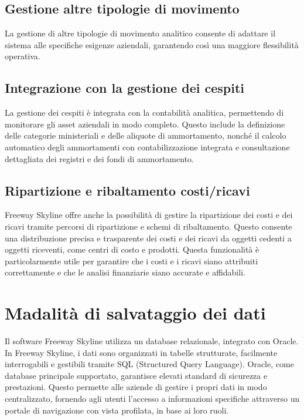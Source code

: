 \documentclass{article}
\begin{document}
\subsection{Gestione altre tipologie di movimento}

La gestione di altre tipologie di movimento analitico consente di adattare il sistema alle specifiche esigenze aziendali, garantendo così una maggiore flessibilità operativa.

\subsection{Integrazione con la gestione dei cespiti}

La gestione dei cespiti è integrata con la contabilità analitica, permettendo di monitorare gli asset aziendali in modo completo. Questo include la definizione delle categorie ministeriali e delle aliquote di ammortamento, nonché il calcolo automatico degli ammortamenti con contabilizzazione integrata e consultazione dettagliata dei registri e dei fondi di ammortamento.

\subsection{Ripartizione e ribaltamento costi/ricavi}

Freeway Skyline offre anche la possibilità di gestire la ripartizione dei costi e dei ricavi tramite percorsi di ripartizione e schemi di ribaltamento. Questo consente una distribuzione precisa e trasparente dei costi e dei ricavi da oggetti cedenti a oggetti riceventi, come centri di costo e prodotti. Questa funzionalità è particolarmente utile per garantire che i costi e i ricavi siano attribuiti correttamente e che le analisi finanziarie siano accurate e affidabili.

\section{Madalità di salvataggio dei dati}
Il software Freeway Skyline utilizza un database relazionale, integrato con Oracle.\\
In Freeway Skyline, i dati sono organizzati in tabelle strutturate, facilmente interrogabili e gestibili tramite SQL (Structured Query Language). Oracle, come database principale supportato, garantisce elevati standard di sicurezza e prestazioni. Questo permette alle aziende di gestire i propri dati in modo centralizzato, fornendo agli utenti l'accesso a informazioni specifiche attraverso un portale di navigazione con vista profilata, in base ai loro ruoli.\\
\end{document}
